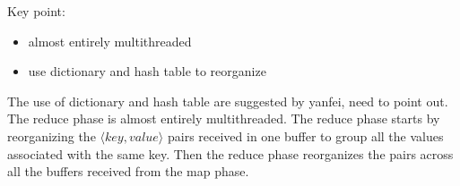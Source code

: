 Key point:
\begin{itemize}
\item almost entirely multithreaded
\item use dictionary and hash table to reorganize 
\end{itemize}

The use of dictionary and hash table are suggested by yanfei, need to point out.
The reduce phase is almost entirely multithreaded. The reduce phase starts
by reorganizing the $\langle key, value \rangle$ pairs received in one buffer to group
all the values associated with the same key. Then the reduce phase
reorganizes the pairs across all the buffers received from the map phase.




